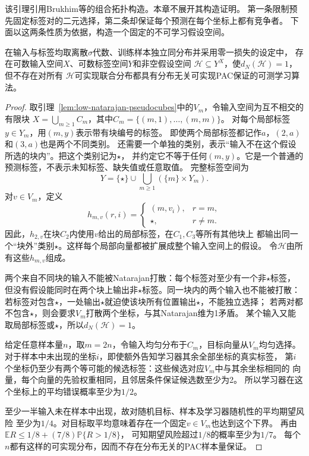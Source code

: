 该引理引用Brukhim等的组合拓扑构造。本章不展开其构造证明。
第一条限制预先固定标签对的二元选择，第二条却保证每个预测在每个坐标上都有竞争者。
下面以这两条性质为依据，构造一个固定的不可学习假设空间。

\begin{theorem}[无限标签下有限Natarajan维并不充分]
\label{thm:natarajan-infinite-counterexample}
在输入与标签均取离散$\sigma$代数、训练样本独立同分布并采用零一损失的设定中，
存在可数输入空间$X$、可数标签空间$Y$和非空假设空间
$\mathcal H\subseteq Y^X$，使$d_N(\mathcal H)=1$，但不存在对所有
$\mathcal H$可实现联合分布都具有分布无关可实现PAC保证的可测学习算法。
\end{theorem}

\begin{proof}
取引理~\ref{lem:low-natarajan-pseudocubes}中的$V_m$，令输入空间为互不相交的有限块
$X=\bigcup_{m\geq1}C_m$，其中$C_m=\{(m,1),\ldots,(m,m)\}$。
对每个局部标签$y\in Y_m$，用$(m,y)$表示带有块编号的标签。
即使两个局部标签都记作$a$，$(2,a)$和$(3,a)$也是两个不同类别。
还需要一个单独的类别，表示“输入不在这个假设所选的块内”。把这个类别记为$\star$，
并约定它不等于任何$(m,y)$。它是一个普通的预测标签，不表示未知标签、缺失值或任意取值。
完整标签空间为
\[
 Y=\{\star\}\cup\bigcup_{m\geq1}(\{m\}\times Y_m).
\]
对$v\in V_m$，定义
\[
 h_{m,v}(r,i)=
 \begin{cases}
 (m,v_i),&r=m,\\
 \star,&r\neq m.
 \end{cases}
\]
因此，$h_{2,v}$在块$C_2$内使用$v$给出的局部标签，在$C_1,C_3$等所有其他块上
都输出同一个“块外”类别$\star$。这样每个局部向量都被扩展成整个输入空间上的假设。
令$\mathcal H$由所有这些$h_{m,v}$组成。

两个来自不同块的输入不能被Natarajan打散：每个标签对至少有一个非$\star$标签，
但没有假设能同时在两个块上输出非$\star$标签。同一块内的两个输入也不能被打散：
若标签对包含$\star$，一处输出$\star$就迫使该块所有位置输出$\star$，不能独立选择；
若两对都不包含$\star$，则会要求$V_m$打散两个坐标，与其Natarajan维为1矛盾。
某个输入又能取局部标签或$\star$，所以$d_N(\mathcal H)=1$。

给定任意样本量$n$，取$m=2n$，令输入均匀分布于$C_m$，目标向量从$V_m$均匀选择。
对于样本中未出现的坐标$i$，即使额外告知学习器其余全部坐标的真实标签，
第$i$个坐标仍至少有两个等可能的候选标签：这些候选对应$V_m$中与其余坐标相同的
向量，每个向量的先验权重相同，且邻居条件保证候选数至少为2。
所以学习器在这个坐标上的平均错误概率至少为$1/2$。

至少一半输入未在样本中出现，故对随机目标、样本及学习器随机性的平均期望风险
至少为$1/4$。对目标取平均意味着存在一个固定$v\in V_m$也达到这个下界。
再由
$\mathbb E R\leq1/8+(7/8)\mathbb P\{R>1/8\}$，
可知期望风险超过$1/8$的概率至少为$1/7$。
每个$n$都有这样的可实现分布，因而不存在分布无关的PAC样本量保证。
\end{proof}

